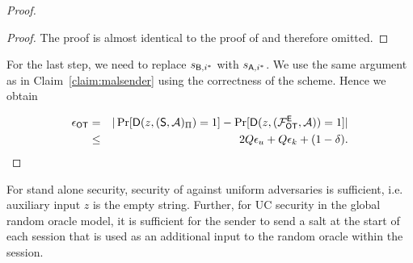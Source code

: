 \begin{proof}
\begin{proof}
The proof is almost identical to the proof of  and therefore omitted.
\pe
\end{proof}

For the last step, we need to replace $s_{\mathsf{B},i^*}$ with $s_{\mathsf{A},i^*}$. We use the same argument as in Claim~\ref{claim:malsender} using the correctness of the scheme. Hence we obtain

\begin{eqnarray*}
\epsilon_{\mathsf{OT}} &=&|\Pr[\mathsf D(z,(\mathsf{S}, \mathcal{A})_{\Pi})=1] -\Pr[\mathsf D(z,(\mathcal{F}_{\mathsf{OT}}^\mathsf{E},\mathcal{A}))=1]|\\
&\leq &2Q\epsilon_{u}+Q\epsilon_{k}+(1-\delta).
\end{eqnarray*}
\pe
\end{proof}


\begin{remark}
For stand alone security, security of \UKA against uniform adversaries is sufficient, i.e. auxiliary input $z$ is the empty string. Further, for UC security in the global random oracle model, it is sufficient for the sender to send a salt at the start of each session that is used as an additional input to the random oracle within the session. 
\end{remark}

